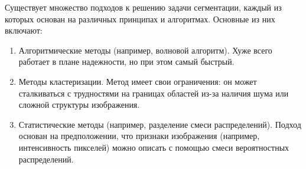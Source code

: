 Существует множество подходов к решению задачи сегментации, каждый из которых основан на различных принципах и алгоритмах. Основные из них включают:

\begin{enumerate}
    \item Алгоритмические методы (например, волновой алгоритм). Хуже всего работает в плане надежности, но при этом самый быстрый.
    \item Методы кластеризации. Метод имеет свои ограничения: он может сталкиваться с трудностями на границах областей из-за наличия шума или сложной структуры изображения.
    \item Статистические методы (например, разделение смеси распределений). Подход основан на предположении, что признаки изображения (например, интенсивность пикселей) можно описать с помощью смеси вероятностных распределений.
\end{enumerate}
